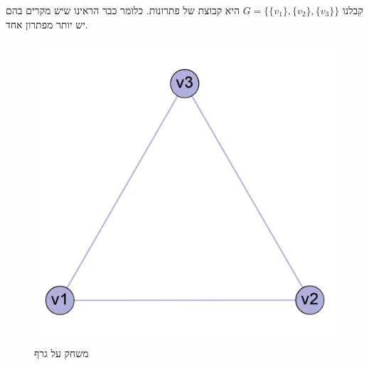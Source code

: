 \documentclass[12pt,leqno]{article}
\theoremstyle{theoremdd}
\begin{document}
קבלנו 
$G = \{\{v_1\}, \{v_2\}, \{v_3\} \}$
היא קבוצת של פתרונות.
כלומר כבר הראינו שיש מקרים בהם יש יותר מפתרון אחד.
\begin{figure}[ht]
    \caption{משחק על גרף}
    \label{fig: clic 3 node graph game} 
    \centering
    \includegraphics[width=.5\textwidth,height=.5\textheight,keepaspectratio]{images/clic_graph_3_node.png}
\end{figure}
\end{document}

